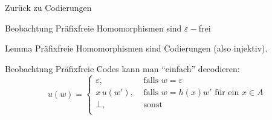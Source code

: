 \begin{frame}{Zurück zu Codierungen}
	\begin{block}{Beobachtung}
		Präfixfreie Homomorphismen sind $\varepsilon-$frei
	\end{block}

	\pause
	\begin{block}{Lemma}
		Präfixfreie Homomorphismen sind Codierungen (also injektiv).
	\end{block}

	\pause
	\begin{block}{Beobachtung}
		Präfixfreie Codes kann man \enquote{einfach} decodieren:
		\[
		u(w) = 
		\begin{cases}
		\varepsilon, & \text{ falls } w=\varepsilon\\
		x\,u(w'), & \text{ falls } w=h(x)w' \text{ für ein } x\in A \\
		\bot,  & \text{ sonst }\\
		\end{cases}
		\]
	\end{block}
	
\end{frame}